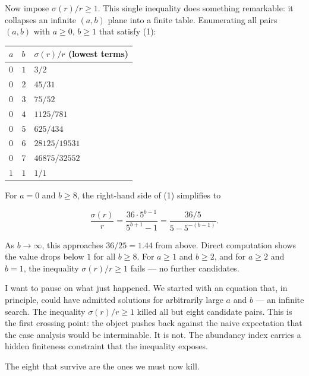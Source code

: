\documentclass[12pt,a4paper]{article}
\begin{document}
    Now impose $\sigma(r)/r \ge 1$. This single inequality does something remarkable: it collapses an infinite $(a,b)$ plane into a finite table. Enumerating all pairs $(a,b)$ with $a \ge 0$, $b \ge 1$ that satisfy (1):

    \begin{table}[htbp]
    \centering
    \small
    \begin{tabularx}{\textwidth}{>{\centering\arraybackslash}X >{\centering\arraybackslash}X >{\centering\arraybackslash}X}
    \toprule
    \rowcolor{gray!25}\textbf{$a$} & \textbf{$b$} & \textbf{$\sigma(r)/r$ (lowest terms)} \\
    \midrule
    \rowcolors{1}{white}{gray!10}
    $0$ & $1$ & $3/2$ \\
    $0$ & $2$ & $45/31$ \\
    $0$ & $3$ & $75/52$ \\
    $0$ & $4$ & $1125/781$ \\
    $0$ & $5$ & $625/434$ \\
    $0$ & $6$ & $28125/19531$ \\
    $0$ & $7$ & $46875/32552$ \\
    $1$ & $1$ & $1/1$ \\
    \bottomrule
    \end{tabularx}
    \end{table}

    For $a = 0$ and $b \ge 8$, the right-hand side of (1) simplifies to

    \[\frac{\sigma(r)}{r} = \frac{36 \cdot 5^{b-1}}{5^{b+1} - 1} = \frac{36/5}{5 - 5^{-(b-1)}}.\]

    As $b \to \infty$, this approaches $36/25 = 1.44$ from above. Direct computation shows the value drops below $1$ for all $b \ge 8$. For $a \ge 1$ and $b \ge 2$, and for $a \ge 2$ and $b = 1$, the inequality $\sigma(r)/r \ge 1$ fails --- no further candidates.

    I want to pause on what just happened. We started with an equation that, in principle, could have admitted solutions for arbitrarily large $a$ and $b$ --- an infinite search. The inequality $\sigma(r)/r \ge 1$ killed all but eight candidate pairs. This is the first crossing point: the object pushes back against the naive expectation that the case analysis would be interminable. It is not. The abundancy index carries a hidden finiteness constraint that the inequality exposes.

    The eight that survive are the ones we must now kill.
\end{document}
